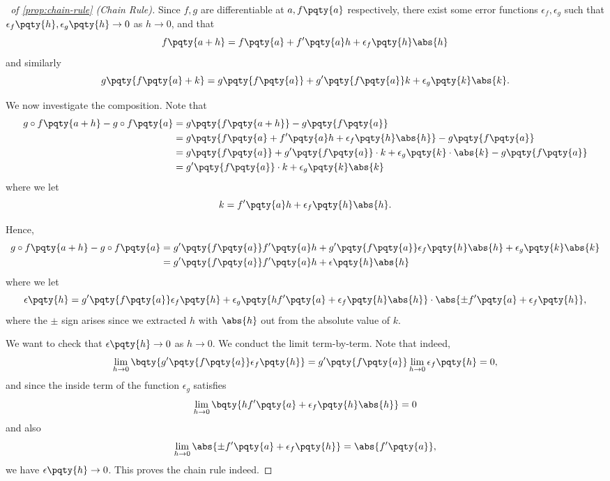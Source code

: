 \begin{proof}[\proofname\ of \autoref{prop:chain-rule} (Chain Rule)]
    Since \(f, g\) are differentiable at \(a, f\pqty{a}\) respectively, there exist some error functions \(\epsilon_f, \epsilon_g\) such that \(\epsilon_f\pqty{h}, \epsilon_g\pqty{h} \to 0\) as \(h \to 0\), and that
    \[
        f\pqty{a + h} = f\pqty{a} + f'\pqty{a} h + \epsilon_f\pqty{h} \abs{h}
    \]
    and similarly
    \[
        g\pqty{f\pqty{a} + k} = g\pqty{f\pqty{a}} + g'\pqty{f\pqty{a}} k + \epsilon_g\pqty{k} \abs{k}.
    \]

    We now investigate the composition. Note that
    \begin{align*}
        g \circ f\pqty{a + h} - g \circ f\pqty{a} &= g\pqty{f\pqty{a + h}} - g\pqty{f\pqty{a}} \\
        &= g\pqty{f\pqty{a} + f'\pqty{a} h + \epsilon_f\pqty{h} \abs{h}} - g\pqty{f\pqty{a}} \\
        &= g\pqty{f\pqty{a}} + g'\pqty{f\pqty{a}} \cdot k + \epsilon_g \pqty{k} \cdot \abs{k} - g\pqty{f\pqty{a}} \\
        &= g'\pqty{f\pqty{a}} \cdot k + \epsilon_g\pqty{k} \abs{k}
    \end{align*}
    where we let
    \[
        k = f'\pqty{a}h + \epsilon_f\pqty{h} \abs{h}.
    \]

    Hence,
    \begin{align*}
        g \circ f\pqty{a + h} - g \circ f\pqty{a} &= g'\pqty{f\pqty{a}} f'\pqty{a} h + g'\pqty{f\pqty{a}} \epsilon_f\pqty{h} \abs{h} + \epsilon_g\pqty{k} \abs{k} \\
        &= g'\pqty{f\pqty{a}} f'\pqty{a} h + \epsilon\pqty{h} \abs{h}
    \end{align*}
    where we let
    \[
        \epsilon\pqty{h} = g'\pqty{f\pqty{a}} \epsilon_f\pqty{h} + \epsilon_g\pqty{h f'\pqty{a} + \epsilon_f\pqty{h} \abs{h}} \cdot \abs{\pm f'\pqty{a} + \epsilon_f\pqty{h}},
    \]
    where the \(\pm\) sign arises since we extracted \(h\) with \(\abs{h}\) out from the absolute value of \(k\).

    We want to check that \(\epsilon\pqty{h} \to 0\) as \(h \to 0\). We conduct the limit term-by-term. Note that indeed,
    \[
        \lim_{h \to 0} \bqty{g'\pqty{f\pqty{a}} \epsilon_f\pqty{h}} = g'\pqty{f\pqty{a}} \lim_{h \to 0} \epsilon_f\pqty{h} = 0,
    \]
    and since the inside term of the function \(\epsilon_g\) satisfies
    \[
        \lim_{h \to 0} \bqty{h f'\pqty{a} + \epsilon_f\pqty{h} \abs{h}} = 0
    \]
    and also
    \[
        \lim_{h \to 0} \abs{\pm f'\pqty{a} + \epsilon_f\pqty{h}} = \abs{f'\pqty{a}},
    \]
    we have \(\epsilon\pqty{h} \to 0\). This proves the chain rule indeed.
\end{proof}

